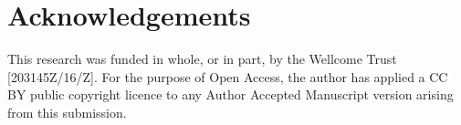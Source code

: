 \section{Acknowledgements}
This research was funded in whole, or in part, by the Wellcome Trust [203145Z/16/Z]. For the purpose of Open Access, the author has applied a CC BY public copyright licence to any Author Accepted Manuscript version arising from this submission.
